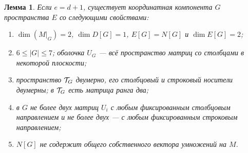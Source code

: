\documentclass[11pt,a4paper]{article}
\numberwithin{equation}{section}
\theoremstyle{plain}
\newtheorem{lemma}[theorem]{Лемма}
\theoremstyle{definition}
\newcommand{\leqs}{\leqslant}\newcommand{\geqs}{\geqslant}
\begin{document}
\begin{lemma}\label{lem:growing-block}
Если $e=d+1$, существует координатная компонента $G$ пространства $E$
со следующими свойствами:
\begin{enumerate}
\item $\dim(M|_G)=2$, $\dim D[G]=1$,
$E[G]=N[G]$ и $\dim E[G]=2$;
\item $6\leqs |G|\leqs7$; оболочка $U_G$ --- всё пространство матриц
со столбцами в некоторой плоскости;
\item пространство $\mathcal T_G$ двумерно, его столбцовый и строковый
носители двумерны; в $\mathcal T_G$ есть матрица ранга два;
\item в $G$ не более двух матриц $U_i$ с любым фиксированным столбцовым
направлением и не более двух --- с любым фиксированным строковым
направлением;
\item $N[G]$ не содержит общего собственного вектора умножений на $M$.
\end{enumerate}
\end{lemma}
\end{document}
